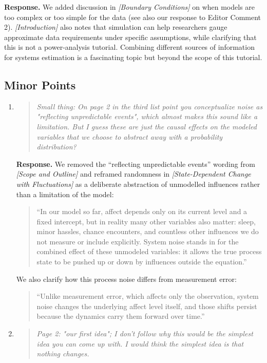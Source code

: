 \documentclass[11pt]{article}
\newcommand{\response}{\textbf{Response.} }
\newcommand{\secit}[1]{\textit{[#1]}}
\newcommand{\msq}[1]{\begin{quote}\small\noindent``#1''\end{quote}}
\newenvironment{reviewerpoint}{\begin{quote}\itshape}{\end{quote}}
\begin{document}
\begin{enumerate}[label=\textbf{Reviewer 1, Major Point \arabic*.}]
\response We added discussion in \secit{Boundary Conditions} on when models are too complex or too simple for the data (see also our response to Editor Comment 2).
\secit{Introduction} also notes that simulation can help researchers gauge approximate data requirements under specific assumptions, while clarifying that this is not a power-analysis tutorial.
Combining different sources of information for systems estimation is a fascinating topic but beyond the scope of this tutorial.
\end{enumerate}

\subsection*{Minor Points}

\begin{enumerate}[label=\textbf{Reviewer 1, Minor Point \arabic*.}]

\item

\begin{reviewerpoint}
Small thing: On page 2 in the third list point you conceptualize noise as "reflecting unpredictable events", which almost makes this sound like a limitation.
But I guess these are just the causal effects on the modeled variables that we choose to abstract away with a probability distribution?
\end{reviewerpoint}

\response We removed the ``reflecting unpredictable events'' wording from \secit{Scope and Outline} and reframed randomness in \secit{State-Dependent Change with Fluctuations} as a deliberate abstraction of unmodelled influences rather than a limitation of the model:
\msq{In our model so far, affect depends only on its current level and a fixed intercept, but in reality many other variables also matter: sleep, minor hassles, chance encounters, and countless other influences we do not measure or include explicitly.
System noise stands in for the combined effect of these unmodeled variables: it allows the true process state to be pushed up or down by influences outside the equation.}
We also clarify how this process noise differs from measurement error:
\msq{Unlike measurement error, which affects only the observation, system noise changes the underlying affect level itself, and those shifts persist because the dynamics carry them forward over time.}
\item

\begin{reviewerpoint}
Page 2: "our first idea"; I don't follow why this would be the simplest idea you can come up with.
I would think the simplest idea is that nothing changes.
\end{reviewerpoint}


\end{enumerate}
\end{document}
